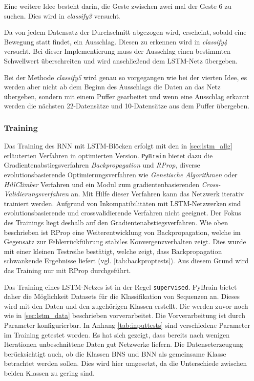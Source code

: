 Eine weitere Idee besteht darin, die Geste zwischen zwei mal der Geste 6 zu 
suchen. Dies wird in \textit{classify3} versucht.

Da von jedem Datensatz der Durchschnitt abgezogen wird, erscheint, sobald eine 
Bewegung statt findet, ein Ausschlag. Diesen zu erkennen wird in \textit{classify4} 
versucht. Bei dieser Implementierung muss der Ausschlag einen bestimmten Schwellwert 
überschreiten und wird anschließend dem LSTM-Netz übergeben.

Bei der Methode \textit{classify5} wird genau so vorgegangen wie bei der vierten 
Idee, es werden aber nicht ab dem Beginn des Ausschlags die Daten an das 
Netz übergeben, sondern mit einem Puffer gearbeitet und wenn eine Ausschlag erkannt 
werden die nächsten 22-Datensätze und 10-Datensätze aus dem Puffer übergeben.

\subsubsection{Training}
\label{sec:lstm_training}
Das Training des \ac{RNN} mit \ac{LSTM}-Blöcken erfolgt mit den in
\autoref{sec:lstm_allg} erläuterten Verfahren in optimierten Version.
\texttt{PyBrain} bietet dazu die Gradientenabstiegsverfahren
\textit{Backpropagation} und \textit{\ac{RProp}}, diverse evolutionsbasierende
Optimierungsverfahren wie \textit{Genetische Algorithmen} oder
\textit{HillClimber} Verfahren und ein Modul zum gradientenbasierenden
\textit{Cross-Validierungsverfahren} an. Mit Hilfe dieser Verfahren kann das
Netzwerk iterativ trainiert werden. Aufgrund von Inkompatibilitäten mit
\ac{LSTM}-Netzwerken sind evolutionsbasierende und crossvalidierende Verfahren
nicht geeignet. Der Fokus des Trainings liegt deshalb auf den
Gradientenabstiegsverfahren. Wie oben beschrieben ist \ac{RProp} eine
Weiterentwicklung von Backpropagation, welche im Gegensatz zur Fehlerrückführung
stabiles Konvergenzverhalten zeigt. Dies wurde mit einer kleinen Testreihe
bestätigt, welche zeigt, dass Backpropagation schwankende Ergebnisse liefert
(vgl. \autoref{tab:backproptests}). Aus diesem Grund wird das Training nur mit
\ac{RProp} durchgeführt.
 
Das Training eines \ac{LSTM}-Netzes ist in der Regel \texttt{supervised}.
PyBrain bietet daher die Möglichkeit Datasets für die Klassifikation von
Sequenzen an. Dieses wird mit den Daten und den zugehörigen Klassen erstellt.
Die werden zuvor noch wie in \autoref{sec:lstm_data} beschrieben vorverarbeitet.
Die Vorverarbeitung ist durch Parameter konfigurierbar. In Anhang
\autoref{tab:inputtests} sind verschiedene Parameter im Training getestet
worden. Es hat sich gezeigt, dass bereits nach wenigen Iterationen unbeschnittene
Daten gut Netzwerke liefern. Die Datenseterzeugung berücksichtigt auch, ob die
Klassen \ac{BNS} und \ac{BNN} als gemeinsame Klasse betrachtet werden sollen.
Dies wird hier umgesetzt, da die Unterschiede zwischen beiden Klassen zu gering
sind. 

